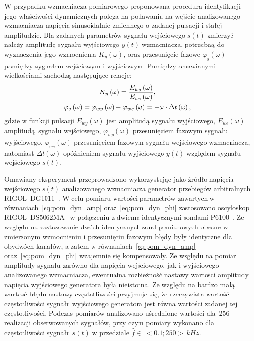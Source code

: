 W przypadku wzmacniacza pomiarowego proponowana procedura identyfikacji jego właściwości dynamicznych polega na podawaniu na wejście analizowanego wzmacniacza napięcia sinusoidalnie zmiennego o zadanej pulsacji i stałej amplitudzie. Dla zadanych parametrów sygnału wejściowego $s(t)$ zmierzyć należy amplitudę sygnału wyjściowego $y(t)$ wzmacniacza, potrzebną do wyznaczenia jego wzmocnienia $K_{y}(\omega)$, oraz przesunięcie fazowe $\varphi_{y}(\omega)$ pomiędzy sygnałem wejściowym i wyjściowym. Pomiędzy omawianymi wielkościami zachodzą następujące relacje:
\begin{gather}
K_{y} \left(\omega\right) = \frac{E_{wy} \left(\omega\right)}{E_{we} \left(\omega\right)} \label{eq:pom_dyn_amp}, \\
\varphi_{y} \left(\omega\right) = \varphi_{wy} \left(\omega\right) - \varphi_{we} \left(\omega\right) = -\omega \cdot \Delta t \left(\omega\right) \label{eq:pom_dyn_phi},
\end{gather}
gdzie w funkcji pulsacji $E_{wy}(\omega)$ jest amplitudą sygnału wyjściowego, $E_{we}(\omega)$ amplitudą sygnału wejściowego, $\varphi_{wy}(\omega)$ przesunięciem fazowym sygnału wyjściowego, $\varphi_{we}(\omega)$ przesunięciem fazowym sygnału wejściowego wzmacniacza, natomiast $\Delta t(\omega)$ opóźnieniem sygnału wyjściowego $y(t)$ względem sygnału wejściowego $s(t)$.

Omawiany eksperyment przeprowadzono wykorzystując jako źródło napięcia wejściowego $s(t)$ analizowanego wzmacniacza generator przebiegów arbitralnych RIGOL~DG1011~\cite{rigol_fawg}. W celu pomiaru wartości parametrów zawartych w równaniach~\eqref{eq:pom_dyn_amp} oraz~\eqref{eq:pom_dyn_phi} zastosowano oscyloskop RIGOL~DS5062MA~\cite{rigol_dso} w połączeniu z dwiema identycznymi sondami P6100~\cite{wellzion_probes}. Ze względu na zastosowanie dwóch identycznych sond pomiarowych obecne w zmierzonym wzmocnieniu i przesunięciu fazowym błędy były identyczne dla obydwóch kanałów, a zatem w równaniach~\eqref{eq:pom_dyn_amp} oraz~\eqref{eq:pom_dyn_phi} wzajemnie się kompensowały. Ze względu na pomiar amplitudy sygnału zarówno dla napięcia wejściowego, jak i wyjściowego analizowanego wzmacniacza, ewentualna rozbieżność nastawy wartości amplitudy napięcia wyjściowego generatora była nieistotna. Ze względu na bardzo małą wartość błędu nastawy częstotliwości przyjmuje się, że rzeczywista wartość częstotliwości sygnału wyjściowego generatora jest równa wartości zadanej tej częstotliwości. Podczas pomiarów analizowano uśrednione wartości dla~\num{256} realizacji obserwowanych sygnałów, przy czym pomiary wykonano dla częstotliwości sygnału $s(t)$ w przedziale $\hat{f} \in~<\num{0.1};\num{250}>~\unit{kHz}$.

